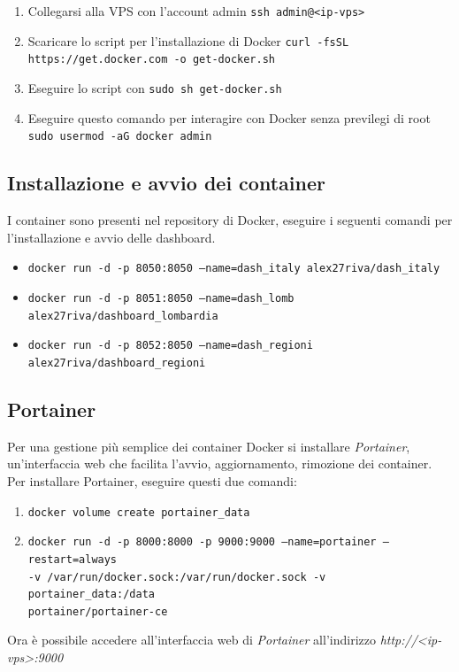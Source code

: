 \begin{enumerate}
\item Collegarsi alla VPS con l'account admin \texttt{ssh admin@<ip-vps>}
\item Scaricare lo script per l'installazione di Docker \texttt{curl -fsSL https://get.docker.com -o get-docker.sh}
\item Eseguire lo script con \texttt{sudo sh get-docker.sh}
\item Eseguire questo comando per interagire con Docker senza previlegi di root \texttt{sudo usermod -aG docker admin}
\end{enumerate}

\subsection{Installazione e avvio dei container}
I container sono presenti nel repository di Docker, eseguire i seguenti comandi per l'installazione e avvio delle dashboard.
\begin{itemize}
\item \texttt{docker run -d -p 8050:8050 --name=dash\_italy alex27riva/dash\_italy}
\item \texttt{docker run -d -p 8051:8050 --name=dash\_lomb alex27riva/dashboard\_lombardia}
\item \texttt{docker run -d -p 8052:8050 --name=dash\_regioni alex27riva/dashboard\_regioni}
\end{itemize}

\subsection{Portainer}
Per una gestione più semplice dei container Docker si installare \emph{Portainer}, un'interfaccia web che facilita l'avvio, aggiornamento, rimozione dei container.
Per installare Portainer, eseguire questi due comandi:
\begin{enumerate}
    \item \texttt{docker volume create portainer\_data}
    \item \texttt{docker run -d -p 8000:8000 -p 9000:9000 --name=portainer --restart=always\\ -v /var/run/docker.sock:/var/run/docker.sock -v portainer\_data:/data\\ portainer/portainer-ce}
\end{enumerate}
Ora è possibile accedere all'interfaccia web di \emph{Portainer} all'indirizzo \emph{http://\textless ip-vps\textgreater:9000}

